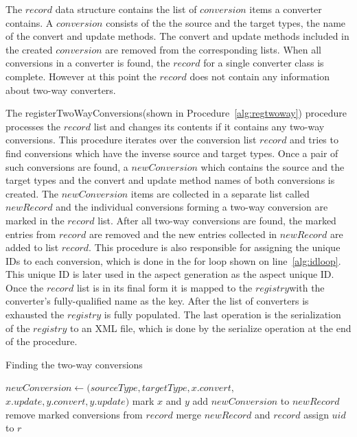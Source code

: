 The $record$ data structure contains the list of $conversion$ items a converter contains. A $conversion$ consists of the the source and the target types, the name of the convert and update methods. 
The convert and update methods included in the created $conversion$ are removed from the corresponding lists. 
When all conversions in a converter is found, the $record$ for a single converter class is complete. 
However at this point the $record$ does not contain any information about two-way converters.

The registerTwoWayConversions(shown in Procedure~\ref{alg:regtwoway}) procedure processes the $record$ list and changes its contents if it contains any two-way conversions.
This procedure iterates over the conversion list $record$ and tries to find conversions which have the inverse source and target types. 
Once a pair of such conversions are found, a $newConversion$ which contains the source and the target types and the convert and update method names of both conversions is created. 
The $newConversion$ items are collected in a separate list called $newRecord$ and the individual conversions forming a two-way conversion are marked in the $record$ list. 
After all two-way conversions are found, the marked entries from $record$ are removed and the new entries collected in $newRecord$ are added to list $record$. 
This procedure is also responsible for assigning the unique IDs to each conversion, which is done in the for loop shown on line~\ref{alg:idloop}.
This unique ID is later used in the aspect generation as the aspect unique ID. 
Once the $record$ list is in its final form it is mapped to the $registry$with the converter's fully-qualified name as the key. 
After the list of converters is exhausted the $registry$ is fully populated.
The last operation is the serialization of the $registry$ to an XML file, which is done by the serialize operation at the end of the procedure.

\begin{algorithm}
\caption{Finding the two-way conversions}\label{alg:reg2way}
	\begin{algorithmic}[1]
				\State $newConversion \gets (sourceType, targetType, x.convert,$
				\\\hspace{\algorithmicindent}$ x.update, y.convert, y.update)$
				\State mark $x$ and $y$
				\State add $newConversion$ to $newRecord$
				\EndIf
			\EndIf
		\EndFor
		\EndFor
		\State remove marked conversions from $record$
		\State merge $newRecord$ and $record$
		 \label{alg:idloop}
		\State assign $uid$ to $r$
		\EndFor
		\EndProcedure
	\end{algorithmic}
\end{algorithm}

